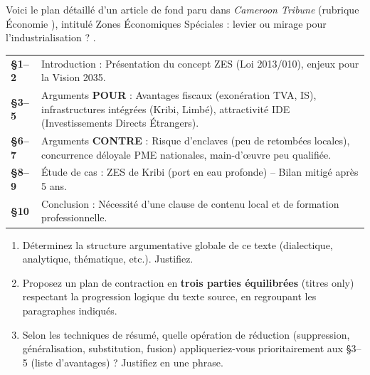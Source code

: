 \documentclass[11pt]{article}
\begin{document}
\begin{exercice}
Voici le plan détaillé d'un article de fond paru dans \textit{Cameroon Tribune} (rubrique \og Économie \fg{}), intitulé \og Zones Économiques Spéciales : levier ou mirage pour l'industrialisation ? \fg{}.

\begin{tabularx}{\linewidth}{@{} >{\bfseries}l X @{}}
\textbf{§1--2} & Introduction : Présentation du concept ZES (Loi 2013/010), enjeux pour la Vision 2035. \\
\textbf{§3--5} & Arguments \textbf{POUR} : Avantages fiscaux (exonération TVA, IS), infrastructures intégrées (Kribi, Limbé), attractivité IDE (Investissements Directs Étrangers). \\
\textbf{§6--7} & Arguments \textbf{CONTRE} : Risque d'enclaves (peu de retombées locales), concurrence déloyale PME nationales, main-d'œuvre peu qualifiée. \\
\textbf{§8--9} & Étude de cas : ZES de Kribi (port en eau profonde) -- Bilan mitigé après 5 ans. \\
\textbf{§10} & Conclusion : Nécessité d'une clause de contenu local et de formation professionnelle.
\end{tabularx}

\begin{enumerate}
    \item Déterminez la structure argumentative globale de ce texte (dialectique, analytique, thématique, etc.). Justifiez.
    \item Proposez un plan de contraction en \textbf{trois parties équilibrées} (titres only) respectant la progression logique du texte source, en regroupant les paragraphes indiqués.
    \item Selon les techniques de résumé, quelle opération de réduction (suppression, généralisation, substitution, fusion) appliqueriez-vous prioritairement aux §3--5 (liste d'avantages) ? Justifiez en une phrase.
\end{enumerate}
\end{exercice}
\end{document}
